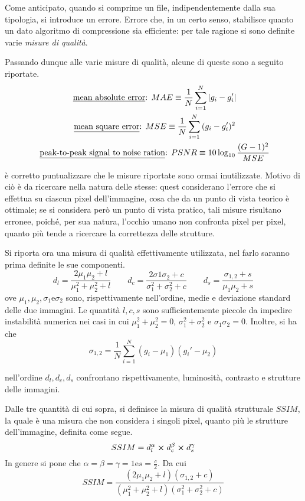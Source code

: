 \documentclass{subfiles}
\begin{document}
Come anticipato, quando si comprime un file, indipendentemente dalla sua tipologia, si introduce un errore.
Errore che, in un certo senso, stabilisce quanto un dato algoritmo di compressione sia efficiente: per tale ragione si sono definite varie \emph{misure di qualità}.

Passando dunque alle varie misure di qualità, alcune di queste sono a seguito riportate.
\[\begin{gathered}
        \text{\underline{mean absolute error}:} MAE \equiv \frac{1}{N} \sum\limits_{i = 1}^{N}{\abs{g_{i} - g_{i}'}} \\
        \text{\underline{mean square error}:} MSE \equiv \frac{1}{N} \sum\limits_{i = 1}^{N}{(g_{i} - g_{i}')^{2}} \\
        \text{\underline{peak-to-peak signal to noise ration}:} PSNR \equiv 10\log_{10}\frac{(G - 1)^{2}}{MSE}
    \end{gathered}\]

\begin{Remark*}
    è corretto puntualizzare che le misure riportate sono ormai inutilizzate.
    Motivo di ciò è da ricercare nella natura delle stesse: quest considerano l'errore che si effettua su ciascun pixel dell'immagine,
    cosa che da un punto di vista teorico è ottimale; se si considera però un punto di vista pratico, tali misure risultano erronee,
    poiché, per sua natura, l'occhio umano non confronta pixel per pixel, quanto più tende a ricercare la correttezza delle strutture.
\end{Remark*}

Si riporta ora una misura di qualità effettivamente utilizzata, nel farlo saranno prima definite le sue componenti.
\[
    d_{l} = \frac{2 \mu_{1}\mu_{2} + l}{\mu_{1}^{2} + \mu_{2}^{2} + l} \qquad
    d_{c} = \frac{2 \sigma{1}\sigma_{2} + c}{\sigma_{1}^{2} + \sigma_{2}^{2} + c} \qquad
    d_{s} = \frac{\sigma_{1,2} + s}{\mu_{1}\mu_{2} + s}
\]
ove \(\mu_{1}, \mu_{2}, \sigma_{1} \text{e} \sigma_{2}\) sono, rispettivamente nell'ordine, medie e deviazione standard delle due immagini.
Le quantità \(l, c, s\) sono sufficientemente piccole da impedire instabilità numerica nei casi in cui \(\mu_{1}^{2} + \mu_{2}^{2} = 0\),
\( \sigma_{1}^{2} + \sigma_{2}^{2}\) e \(\sigma_{1}\sigma_{2} = 0\). Inoltre, si ha che
\[
    \sigma_{1, 2} = \frac{1}{N} \sum\limits_{i = 1}^{N}{(g_{i} - \mu_{1})(g_{i}' - \mu_{2})}
\]

\begin{Note*}
    nell'ordine \(d_{l}, d_{c}, d_{s}\) confrontano rispettivamente, luminosità, contrasto e strutture delle immagini.
\end{Note*}

Dalle tre quantità di cui sopra, si definisce la misura di qualità strutturale \(SSIM\), la quale è una misura che non considera i singoli pixel, quanto più le strutture dell'immagine,
definita come segue.
\[
    SSIM = d_{l}^{\alpha} \cp d_{c}^{\beta} \cp d_{s}^{\gamma}
\]
In genere si pone che \(\alpha = \beta = \gamma = 1 \text{e} s = \tfrac{c}{2}\). Da cui
\[
    SSIM = \frac{(2 \mu_{1}\mu_{2} + l)(\sigma_{1,2} + c)}{(\mu_{1}^{2} + \mu_{2}^{2} + l)(\sigma_{1}^{2} + \sigma_{2}^{2} + c)}
\]

\end{document}
